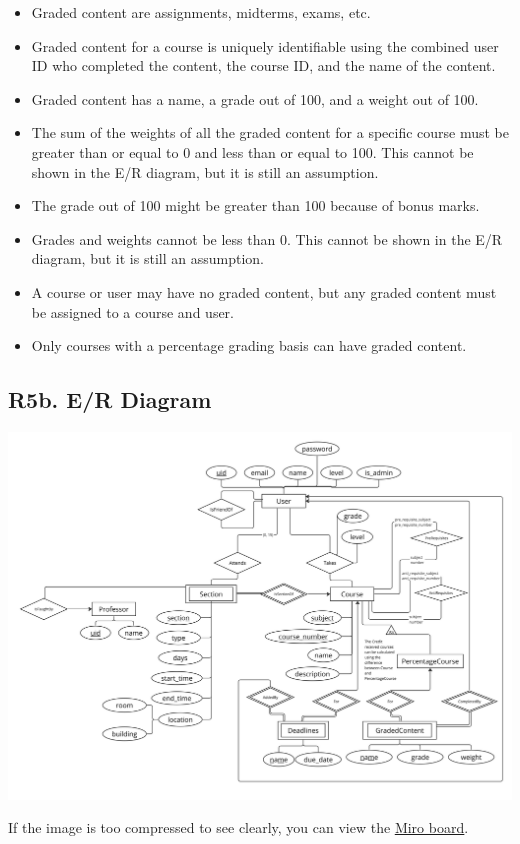 \documentclass[12pt, a4paper]{article}
\begin{document}
\begin{itemize}
    \item Graded content are assignments, midterms, exams, etc.
    \item Graded content for a course is uniquely identifiable using the combined user ID who completed the content, the course ID, and the name of the content.
    \item Graded content has a name, a grade out of 100, and a weight out of 100.
    \item The sum of the weights of all the graded content for a specific course must be greater than or equal to 0 and less than or equal to 100. This cannot be shown in the E/R diagram, but it is still an assumption.
    \item The grade out of 100 might be greater than 100 because of bonus marks.
    \item Grades and weights cannot be less than 0. This cannot be shown in the E/R diagram, but it is still an assumption.
    \item A course or user may have no graded content, but any graded content must be assigned to a course and user.
    \item Only courses with a percentage grading basis can have graded content.
\end{itemize}

\subsection*{R5b. E/R Diagram}
\begin{center}
    \includegraphics[width=\textwidth]{erd}
\end{center}
If the image is too compressed to see clearly, you can view the \underline{\href{https://miro.com/app/board/uXjVM-yog60=/}{Miro board}}.\\
\end{document}
